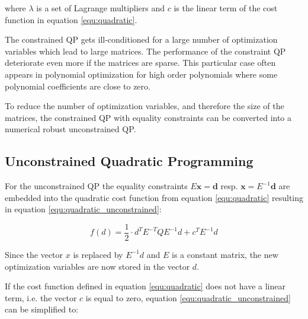 where $\lambda$ is a set of Lagrange multipliers and $c$ is the linear term of the cost function in equation \ref{equ:quadratic}. \newline

The constrained QP gets ill-conditioned for a large number of optimization variables which lead to large matrices. The performance of the constraint QP deteriorate even more if the matrices are sparse. This particular case often appears in polynomial optimization for high order polynomials where some polynomial coefficients are close to zero. \newline

To reduce the number of optimization variables, and therefore the size of the matrices, the constrained QP with equality constraints can be converted into a numerical robust unconstrained QP.

\subsection{Unconstrained Quadratic Programming}

For the unconstrained QP the equality constraints $E \mathbf{x} = \mathbf{d}$ resp. $\mathbf{x} = E^{-1} \mathbf{d}$ are embedded into the quadratic cost function from equation \ref{equ:quadratic} resulting in equation \ref{equ:quadratic_unconstrained}:

\begin{equation}
 f(d)  = \frac{1}{2} \cdot d^T  E^{-T}  Q  E^{-1}  d + c^T  E^{-1} d
\label{equ:quadratic_unconstrained}
\end{equation}

Since the vector $x$ is replaced by $E^{-1} d$ and $E$ is a constant matrix, the new optimization variables are now stored in the vector $d$. \newline
 

If the cost function defined in equation \ref{equ:quadratic} does not have a linear term, i.e. the vector $c$ is equal to zero, equation \ref{equ:quadratic_unconstrained} can be simplified to:

